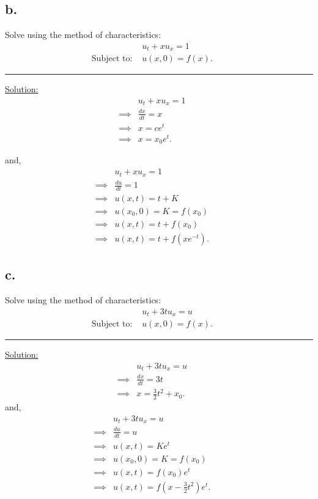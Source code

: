 \documentclass{article}
\begin{document}
\newpage

\subsection*{b.}
Solve using the method of characteristics:
\begin{align*}
  &u_t + x u_x = 1 &&\\
  \text{Subject to: }& u(x,0) = f(x).
\end{align*}

\begin{center}
  \noindent\rule{8cm}{0.4pt}
\end{center}

\underline{Solution:}
\begin{align*}
  &u_t + x u_x = 1 &&\\
  \implies& \frac{dx}{dt} = x &&\\
  \implies& x = ce^t &&\\
  \implies& x = x_0e^t.
\end{align*}

and,
\begin{align*}
  &u_t + x u_x = 1 &&\\
  \implies& \frac{du}{dt} = 1 &&\\
  \implies& u(x,t) = t + K &&\\
  \implies& u(x_0, 0) = K = f(x_0) &&\\
  \implies& u(x,t) = t + f(x_0) &&\\
  \implies& u(x,t) = t + f(xe^{-t}).
\end{align*}

\newpage

\subsection*{c.}
Solve using the method of characteristics:
\begin{align*}
  &u_t + 3t u_x = u &&\\
  \text{Subject to: }& u(x,0) = f(x).
\end{align*}

\begin{center}
  \noindent\rule{8cm}{0.4pt}
\end{center}

\underline{Solution:}
\begin{align*}
  &u_t + 3t u_x = u &&\\
  \implies& \frac{dx}{dt} = 3t &&\\
  \implies& x = \frac{3}{2} t^2 + x_0.
\end{align*}
and,
\begin{align*}
  &u_t + 3t u_x = u &&\\
  \implies& \frac{du}{dt} = u &&\\
  \implies& u(x,t) = Ke^t  &&\\
  \implies& u(x_0, 0) = K = f(x_0) &&\\
  \implies& u(x, t) = f(x_0)e^{t} &&\\
  \implies& u(x, t) = f(x-\frac{3}{2}t^2)e^{t}.
\end{align*}
\end{document}
